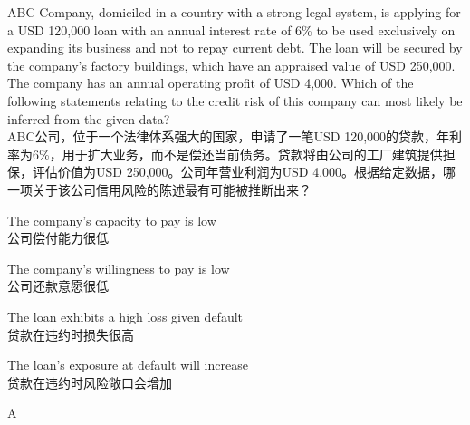 \documentclass{article}
\newcounter{question} %
\begin{document}
\begin{question}
    ABC Company, domiciled in a country with a strong legal system, is applying for a USD 120,000 loan with an annual interest rate of 6\% to be used exclusively on expanding its business and not to repay current debt. The loan will be secured by the company's factory buildings, which have an appraised value of USD 250,000. The company has an annual operating profit of USD 4,000. Which of the following statements relating to the credit risk of this company can most likely be inferred from the given data?
    \\ ABC公司，位于一个法律体系强大的国家，申请了一笔USD 120,000的贷款，年利率为6\%，用于扩大业务，而不是偿还当前债务。贷款将由公司的工厂建筑提供担保，评估价值为USD 250,000。公司年营业利润为USD 4,000。根据给定数据，哪一项关于该公司信用风险的陈述最有可能被推断出来？
\end{question}

\begin{choices}
    \item The company's capacity to pay is low\\
    公司偿付能力很低
    \item The company's willingness to pay is low\\
    公司还款意愿很低
    \item The loan exhibits a high loss given default\\
    贷款在违约时损失很高
    \item The loan's exposure at default will increase\\
    贷款在违约时风险敞口会增加
\end{choices}

\begin{correctanswer}
    A
\end{correctanswer}
\end{document}
